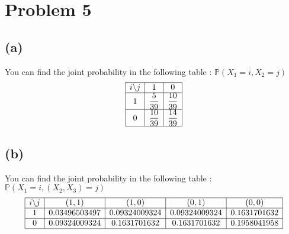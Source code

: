 \documentclass{article}
\begin{document}
\section*{Problem 5}
\subsection*{(a)}
You can find the joint probability in the following table : $\mathbb{P}(X_1 = i, X_2 = j)$ $$\begin{array}{|c|c|c|}
    \hline
    i \backslash j & 1  & 0\\\hline
    
    1 & \dfrac{5}{39} & \dfrac{10}{39}\\\hline
    
    0 & \dfrac{10}{39} & \dfrac{14}{39}\\\hline
\end{array}$$

\subsection*{(b)}
You can find the joint probability in the following table : $\mathbb{P}(X_1 = i, (X_2,X_3)= j)$ $$\begin{array}{|c|c|c|c|c|}
    \hline
    i\backslash j & (1,1) & (1,0) & (0,1) & (0,0)\\\hline
    1&0.03496503497	& 0.09324009324	&0.09324009324	&0.1631701632\\\hline
    0&0.09324009324	&0.1631701632	&0.1631701632	&0.1958041958\\\hline
\end{array}$$
\end{document}
